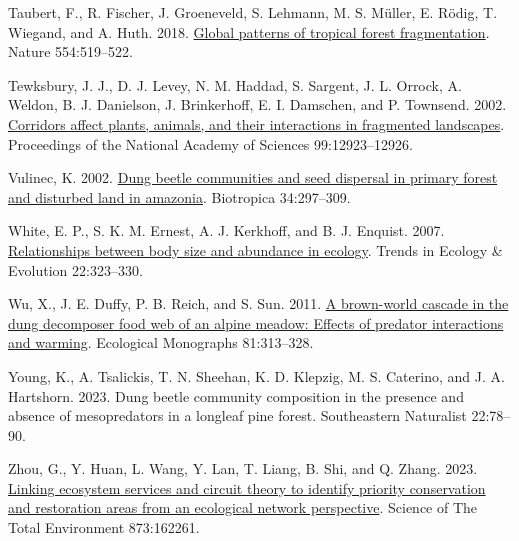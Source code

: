 \documentclass[
  man, donotrepeattitle]{apa6}
\newlength{\cslhangindent}
\newenvironment{CSLReferences}[2] %
 {\begin{list}{}{%
  \setlength{\itemindent}{0pt}
  \setlength{\leftmargin}{0pt}
  \setlength{\parsep}{0pt}
  \ifodd #1
   \setlength{\leftmargin}{\cslhangindent}
   \setlength{\itemindent}{-1\cslhangindent}
  \fi
  \setlength{\itemsep}{#2\baselineskip}}}
 {\end{list}}
\begin{document}
\begin{CSLReferences}{1}{0}
Taubert, F., R. Fischer, J. Groeneveld, S. Lehmann, M. S. Müller, E. Rödig, T. Wiegand, and A. Huth. 2018. \href{https://doi.org/10.1038/nature25508}{Global patterns of tropical forest fragmentation}. Nature 554:519--522.

Tewksbury, J. J., D. J. Levey, N. M. Haddad, S. Sargent, J. L. Orrock, A. Weldon, B. J. Danielson, J. Brinkerhoff, E. I. Damschen, and P. Townsend. 2002. \href{https://doi.org/10.1073/pnas.202242699}{Corridors affect plants, animals, and their interactions in fragmented landscapes}. Proceedings of the National Academy of Sciences 99:12923--12926.

Vulinec, K. 2002. \href{https://doi.org/10.1111/j.1744-7429.2002.tb00541.x}{Dung beetle communities and seed dispersal in primary forest and disturbed land in amazonia}. Biotropica 34:297--309.

White, E. P., S. K. M. Ernest, A. J. Kerkhoff, and B. J. Enquist. 2007. \href{https://doi.org/10.1016/j.tree.2007.03.007}{Relationships between body size and abundance in ecology}. Trends in Ecology \& Evolution 22:323--330.

Wu, X., J. E. Duffy, P. B. Reich, and S. Sun. 2011. \href{https://doi.org/10.1890/10-0808.1}{A brown-world cascade in the dung decomposer food web of an alpine meadow: Effects of predator interactions and warming}. Ecological Monographs 81:313--328.

Young, K., A. Tsalickis, T. N. Sheehan, K. D. Klepzig, M. S. Caterino, and J. A. Hartshorn. 2023. Dung beetle community composition in the presence and absence of mesopredators in a longleaf pine forest. Southeastern Naturalist 22:78--90.

Zhou, G., Y. Huan, L. Wang, Y. Lan, T. Liang, B. Shi, and Q. Zhang. 2023. \href{https://doi.org/10.1016/j.scitotenv.2023.162261}{Linking ecosystem services and circuit theory to identify priority conservation and restoration areas from an ecological network perspective}. Science of The Total Environment 873:162261.

\end{CSLReferences}

\newpage
\end{document}
